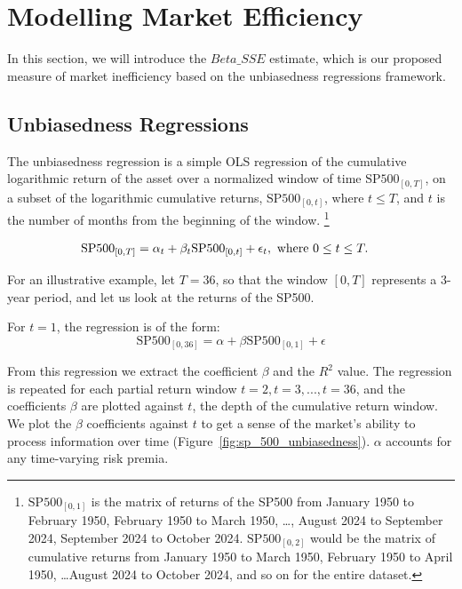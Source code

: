 \section{Modelling Market Efficiency}
\label{sec:market_efficiency}

In this section, we will introduce the $Beta\_SSE$ estimate, which is our proposed measure of market inefficiency based on the unbiasedness regressions framework.

\subsection{Unbiasedness Regressions}

\noindent The unbiasedness regression is a simple OLS regression of the cumulative logarithmic return of the asset over a normalized window of time $\mathrm{SP500}_{[0, T]}$, on a subset of the
logarithmic cumulative returns, $\mathrm{SP500}_{[0, t]}$, where $t \leq T$, and $t$ is the number of months from the beginning of the window.
 \footnote{$\mathrm{SP500}_{[0, 1]}$ is the matrix of returns of the SP500 from January 1950 to February 1950, February 1950 to March 1950, \dots, August 2024 to September 2024, September 2024 to October 2024.\newline
$\mathrm{SP500}_{[0, 2]}$ would be the matrix of cumulative returns from January 1950 to March 1950, February 1950 to April 1950, \dots August 2024 to October 2024, and so on for the entire dataset.}

\begin{equation}
    \begin{aligned}
        \mathrm{SP500}_{[0, T]} &= \alpha_t + \beta_t \mathrm{SP500}_{[0, t]} + \epsilon_{t}, \hfill \text{   where } 0 \leq t \leq T.
    \end{aligned}
\end{equation}

\noindent For an illustrative example, let $T = 36$, so that the window $[0, T]$ represents a 3-year period, and let us look at the returns of the SP500.

\noindent For $t=1$, the regression is of the form:
\begin{equation}
    \mathrm{SP500}_{[0, 36]} = \alpha + \beta \mathrm{SP500}_{[0, 1]} + \epsilon
\end{equation}

\noindent From this regression we extract the coefficient $\beta$ and the $R^2$ value.
The regression is repeated for each partial return window $t=2, t=3, ..., t=36$, and the coefficients $\beta$ are plotted against $t$, the depth of the cumulative return window.
We plot the $\beta$ coefficients against $t$ to get a sense of the market's ability to process information over time (Figure~\ref{fig:sp_500_unbiasedness}).
$\alpha$ accounts for any time-varying risk premia.

